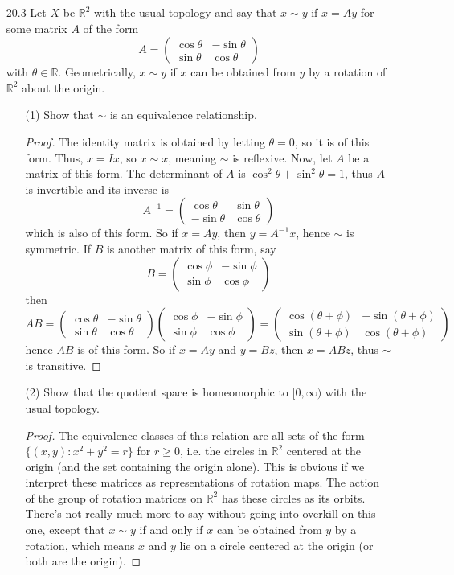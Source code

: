 \documentclass[10pt]{article}
\newcommand{\R}{\mathbb{R}}
\begin{document}
\begin{enumerate}
\item[20.3] Let $X$ be $\R^2$ with the usual topology and say that $x \sim y$ if $x = Ay$ for some matrix $A$ of the form
$$
A = \begin{pmatrix}
\cos \theta & - \sin \theta \\
\sin \theta & \cos \theta
\end{pmatrix}
$$
with $\theta \in \R$.  Geometrically, $x \sim y$ if $x$ can be obtained from $y$ by a rotation of $\R^2$ about the origin.
\begin{enumerate}
\item[(1)] Show that $\sim$ is an equivalence relationship.
\begin{proof}
The identity matrix is obtained by letting $\theta = 0$, so it is of this form.  Thus, $x = Ix$, so $x \sim x$, meaning $\sim$ is reflexive.
Now, let $A$ be a matrix of this form.  The determinant of $A$ is $\cos^2 \theta + \sin^2 \theta = 1$, thus $A$ is invertible and its inverse is
$$
A^{-1} = \begin{pmatrix}
\cos \theta & \sin \theta \\
-\sin \theta & \cos \theta
\end{pmatrix}
$$
which is also of this form.  So if $x = Ay$, then $y = A^{-1}x$, hence $\sim$ is symmetric.  If $B$ is another matrix of this form, say
$$
B = \begin{pmatrix}
\cos \phi & - \sin \phi \\
\sin \phi & \cos \phi
\end{pmatrix}
$$
then
$$
AB = \begin{pmatrix}
\cos \theta & - \sin \theta \\
\sin \theta & \cos \theta
\end{pmatrix}
\begin{pmatrix}
\cos \phi & - \sin \phi \\
\sin \phi & \cos \phi
\end{pmatrix}
=
\begin{pmatrix}
\cos (\theta + \phi) & - \sin (\theta + \phi) \\
\sin (\theta + \phi) & \cos (\theta + \phi)
\end{pmatrix}
$$
hence $AB$ is of this form.  So if $x = Ay$ and $y = Bz$, then $x = ABz$, thus $\sim$ is transitive.
\end{proof}
\item[(2)] Show that the quotient space is homeomorphic to $[0,\infty)$ with the usual topology.
\begin{proof}
The equivalence classes of this relation are all sets of the form $\{(x,y) : x^2 + y^2 = r\}$ for $r \geq 0$, i.e. the circles in $\R^2$ centered at the origin (and the set containing the origin alone).  This is obvious if we interpret these matrices as representations of rotation maps.  The action of the group of rotation matrices on $\R^2$ has these circles as its orbits.  There's not really much more to say without going into overkill on this one, except that $x \sim y$ if and only if $x$ can be obtained from $y$ by a rotation, which means $x$ and $y$ lie on a circle centered at the origin (or both are the origin).


\end{proof}
\end{enumerate}
\end{enumerate}
\end{document}
